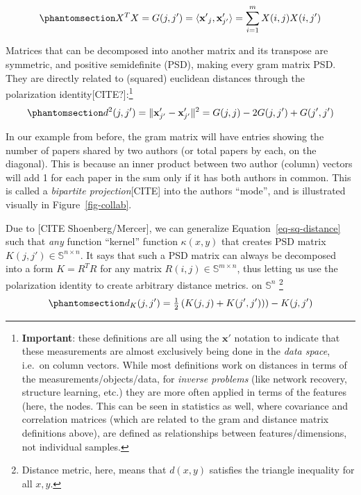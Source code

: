 \documentclass[%
	12pt,
		oneside,
		letterpaper
]{book}
\begin{document}
\begin{equation}\phantomsection\label{eq-gram-mat}{
X^TX=G(j,j')=\langle\mathbf{x'}_j,\mathbf{x}_{j'}'\rangle = \sum_{i=1}^{m} X(i,j)X(i,j')
}\end{equation}

Matrices that can be decomposed into another matrix and its transpose
are symmetric, and positive semidefinite (PSD), making every gram matrix
PSD. They are directly related to (squared) euclidean distances through
the polarization identity{[}CITE?{]}:\footnote{\textbf{Important}: these
  definitions are all using the \(\mathbf{x}'\) notation to indicate
  that these measurements are almost exclusively being done in the
  \emph{data space}, i.e.~on column vectors. While most definitions work
  on distances in terms of the measurements/objects/data, for
  \emph{inverse problems} (like network recovery, structure learning,
  etc.) they are more often applied in terms of the features (here, the
  nodes. This can be seen in statistics as well, where covariance and
  correlation matrices (which are related to the gram and distance
  matrix definitions above), are defined as relationships between
  features/dimensions, not individual samples.}
\begin{equation}\phantomsection\label{eq-sq-distance}{
d^2(j,j') = \|\mathbf{x}_{j'}'-\mathbf{x}_{j'}'\|^2 = G(j,j) - 2G(j,j') + G(j',j') 
}\end{equation}

In our example from before, the gram matrix will have entries showing
the number of papers shared by two authors (or total papers by each, on
the diagonal). This is because an inner product between two author
(column) vectors will add 1 for each paper in the sum only if it has
both authors in common. This is called a \emph{bipartite
projection}{[}CITE{]} into the authors ``mode'', and is illustrated
visually in Figure~\ref{fig-collab}.

Due to {[}CITE Shoenberg/Mercer{]}, we can generalize
Equation~\ref{eq-sq-distance} such that \emph{any} function ``kernel''
function \(\kappa(x,y)\) that creates PSD matrix
\(K(j,j')\in\mathbb{S}^{n\times n}\). It says that such a PSD matrix can
always be decomposed into a form \(K=R^TR\) for any matrix
\(R(i,j)\in \mathbb{S}^{m\times n}\), thus letting us use the
polarization identity to create arbitrary distance metrics. on
\(\mathbb{S}^n\)
\autocite{SimilaritiesgraphsKernels_Avrachenkov2019}\footnote{ Distance
  metric, here, means that \(d(x,y)\) satisfies the triangle inequality
  for all \(x,y\).}
\begin{equation}\phantomsection\label{eq-dist-kernel}{
d_K(j,j') = \tfrac{1}{2}\left(K(j,j)+K(j',j'))\right)-K(j,j')
}\end{equation}
\end{document}
